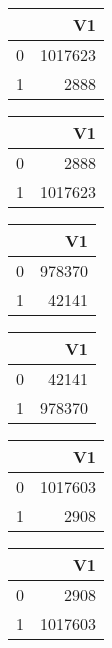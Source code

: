 \bigskip\bigskip
\centering
\begin{tabular}{rr}
  \hline
 & V1 \\ 
  \hline
0 & 1017623 \\ 
  1 & 2888 \\ 
   \hline
\end{tabular}

\bigskip\bigskip
\centering
\begin{tabular}{rr}
  \hline
 & V1 \\ 
  \hline
0 & 2888 \\ 
  1 & 1017623 \\ 
   \hline
\end{tabular}

\bigskip\bigskip
\centering
\begin{tabular}{rr}
  \hline
 & V1 \\ 
  \hline
0 & 978370 \\ 
  1 & 42141 \\ 
   \hline
\end{tabular}

\bigskip\bigskip
\centering
\begin{tabular}{rr}
  \hline
 & V1 \\ 
  \hline
0 & 42141 \\ 
  1 & 978370 \\ 
   \hline
\end{tabular}

\bigskip\bigskip
\centering
\begin{tabular}{rr}
  \hline
 & V1 \\ 
  \hline
0 & 1017603 \\ 
  1 & 2908 \\ 
   \hline
\end{tabular}

\bigskip\bigskip
\centering
\begin{tabular}{rr}
  \hline
 & V1 \\ 
  \hline
0 & 2908 \\ 
  1 & 1017603 \\ 
   \hline
\end{tabular}

